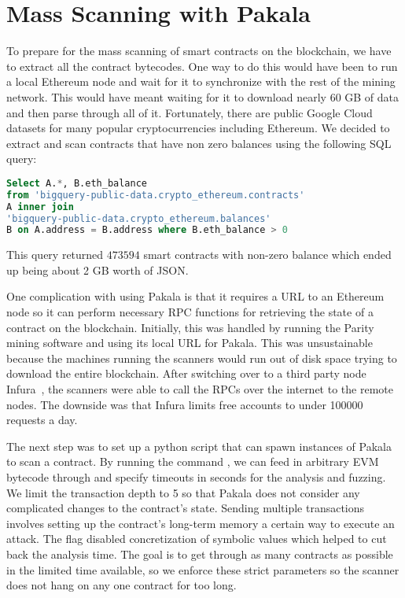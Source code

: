 \section{Mass Scanning with Pakala}
To prepare for the mass scanning of smart contracts on the blockchain, we have to extract all the contract bytecodes.
One way to do this would have been to run a local Ethereum node and wait for it to synchronize with the rest of the mining network.
This would have meant waiting for it to download nearly 60 GB of data and then parse through all of it.
Fortunately, there are public Google Cloud datasets for many popular cryptocurrencies including Ethereum.
We decided to extract and scan contracts that have non zero balances using the following SQL query: 
\begin{lstlisting}[language=SQL, basicstyle=\small]
Select A.*, B.eth_balance 
from 'bigquery-public-data.crypto_ethereum.contracts' 
A inner join 
'bigquery-public-data.crypto_ethereum.balances' 
B on A.address = B.address where B.eth_balance > 0
\end{lstlisting}
This query returned $473594$ smart contracts with non-zero balance which ended up being about 2 GB worth of JSON.

One complication with using Pakala is that it requires a URL to an Ethereum node so it can perform necessary RPC functions for retrieving the state of a contract on the blockchain.
Initially, this was handled by running the Parity~\cite{parity} mining software and using its local URL for Pakala.
This was unsustainable because the machines running the scanners would run out of disk space trying to download the entire blockchain.
After switching over to a third party node Infura~\cite{infura}, the scanners were able to call the RPCs over the internet to the remote nodes.
The downside was that Infura limits free accounts to under 100000 requests a day.

The next step was to set up a python script that can spawn instances of Pakala to scan a contract.
By running the command 
, 
we can feed in arbitrary EVM bytecode through  and specify timeouts in seconds for the analysis and fuzzing.
We limit the transaction depth to 5 so that Pakala does not consider any complicated changes to the contract's state.
Sending multiple transactions involves setting up the contract's long-term memory a certain way to execute an attack.
The  flag disabled concretization of symbolic values which helped to cut back the analysis time.
The goal is to get through as many contracts as possible in the limited time available, so we enforce these strict parameters so the scanner does not hang on any one contract for too long.


